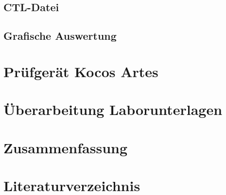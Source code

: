 \documentclass{scrartcl}
\begin{document}
\begin{onehalfspace}
\subsection{CTL-Datei}
\subsection{Grafische Auswertung}

\section{Prüfgerät Kocos Artes}

\section{Überarbeitung Laborunterlagen}
\section{Zusammenfassung}

\newpage
{}
\setcounter{page}{1}
\section{Literaturverzeichnis}



\end{onehalfspace}
\end{document}
